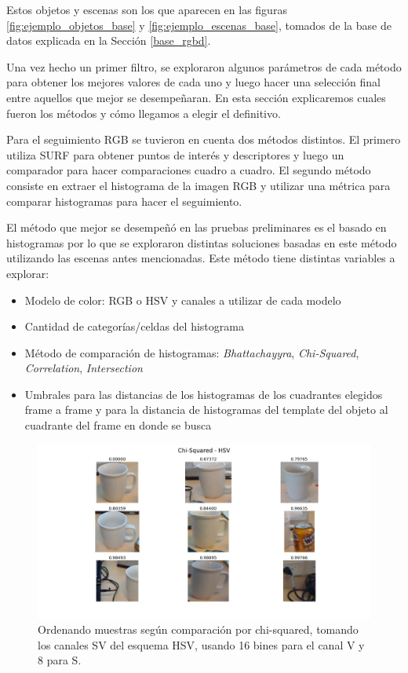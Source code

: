 Estos objetos y escenas son los que aparecen en las figuras \ref{fig:ejemplo_objetos_base} y \ref{fig:ejemplo_escenas_base}, tomados de la base de datos explicada en la Sección \ref{base_rgbd}.

Una vez hecho un primer filtro, se exploraron algunos parámetros de cada método para obtener los mejores valores de cada uno y luego hacer una selección final entre aquellos que mejor se desempeñaran. En esta sección explicaremos cuales fueron los métodos y cómo llegamos a elegir el definitivo.

Para el seguimiento RGB se tuvieron en cuenta dos métodos distintos. El primero utiliza SURF \cite{surf} para obtener puntos de interés y descriptores y luego un comparador para hacer comparaciones cuadro a cuadro. El segundo método consiste en extraer el histograma de la imagen RGB y utilizar una métrica para comparar histogramas para hacer el seguimiento.

El método que mejor se desempeñó en las pruebas preliminares es el basado en histogramas por lo que se exploraron distintas soluciones basadas en este método utilizando las escenas antes mencionadas. Este método tiene distintas variables a explorar:
\begin{itemize}
	\item Modelo de color: RGB o HSV y canales a utilizar de cada modelo
	\item Cantidad de categorías/celdas del histograma
	\item Método de comparación de histogramas: \textit{Bhattachayyra}, \textit{Chi-Squared}, \textit{Correlation}, \textit{Intersection}
	\item Umbrales para las distancias de los histogramas de los cuadrantes elegidos frame a frame y para la distancia de histogramas del template del objeto al cuadrante del frame en donde se busca
\end{itemize}


\begin{figure}
	\centering
	\includegraphics[width=\textwidth]{img/results_chi-squared_hsv_8s_16v.png}
	\caption{Ordenando muestras según comparación por chi-squared, tomando los canales SV del esquema HSV, usando 16 bines para el canal V y 8 para S.}
	\label{pruebas_eleccion_canales}
\end{figure}

